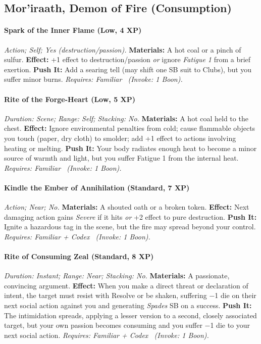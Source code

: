 \subsection{Mor'iraath, Demon of Fire (Consumption)}
\paragraph{Spark of the Inner Flame (Low, 4 XP)} \emph{Action; Self; Yes (destruction/passion).}
\textbf{Materials:} A hot coal or a pinch of sulfur.
\textbf{Effect:} +1 effect to destruction/passion \emph{or} ignore \emph{Fatigue 1} from a brief exertion.
\textbf{Push It:} Add a searing tell (may shift one SB suit to Clubs), but you suffer minor burns.
\emph{Requires: Familiar \ (\textit{Invoke:} 1 Boon).}
\paragraph{Rite of the Forge-Heart (Low, 5 XP)} \emph{Duration: Scene; Range: Self; Stacking: No.}
\textbf{Materials:} A hot coal held to the chest.
\textbf{Effect:} Ignore environmental penalties from cold; cause flammable objects you touch (paper, dry cloth) to smolder; add +1 effect to actions involving heating or melting.
\textbf{Push It:} Your body radiates enough heat to become a minor source of warmth and light, but you suffer Fatigue 1 from the internal heat.
\emph{Requires: Familiar \ (\textit{Invoke:} 1 Boon).}
\paragraph{Kindle the Ember of Annihilation (Standard, 7 XP)} \emph{Action; Near; No.}
\textbf{Materials:} A shouted oath or a broken token.
\textbf{Effect:} Next damaging action gains \emph{Severe} if it hits \emph{or} +2 effect to pure destruction.
\textbf{Push It:} Ignite a hazardous tag in the scene, but the fire may spread beyond your control.
\emph{Requires: Familiar + Codex \ (\textit{Invoke:} 1 Boon).}
\paragraph{Rite of Consuming Zeal (Standard, 8 XP)} \emph{Duration: Instant; Range: Near; Stacking: No.}
\textbf{Materials:} A passionate, convincing argument.
\textbf{Effect:} When you make a direct threat or declaration of intent, the target must resist with Resolve or be shaken, suffering −1 die on their next social action against you and generating \emph{Spades} SB on a success.
\textbf{Push It:} The intimidation spreads, applying a lesser version to a second, closely associated target, but your own passion becomes consuming and you suffer −1 die to your next social action.
\emph{Requires: Familiar + Codex \ (\textit{Invoke:} 1 Boon).}

